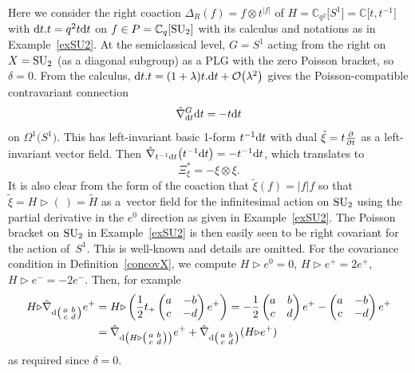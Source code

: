 \documentclass[10pt,a4paper]{amsart}
\numberwithin{equation}{section}
\newcommand{\C}{{\mathbb{C}}}
\newcommand{\<}{{\langle}}
\renewcommand{\>}{{\rangle}}
\newcommand{\tens}{\otimes}
\newcommand{\extd}{{\rm d}}
\newcommand{\del}{{\partial}}
\newcommand{\la}{{\triangleright}}
\begin{document}
\begin{Example}\label{exS2PB}
Here we consider the right coaction $\Delta_R(f)=f\tens t^{|f|}$ of $H=\C_{q^2}\big[S^1\big]=\C\big[t,t^{-1}\big]$ with $\extd t.t=q^2t\extd t$ on $f\in P=\C_q[{\rm SU}_2]$ with its calculus and notations as in Example~\ref{exSU2}. At the semiclassical level, $G=S^1$ acting from the right on $X={\rm SU}_2$ (as a diagonal subgroup) as a PLG with the zero Poisson bracket, so $\delta=0$. From the calculus, $\extd t.t=(1+{\lambda})t.\extd t+\mathcal{O}\big(\lambda^2\big)$ gives the Poisson-compatible contravariant connection
\begin{equation*}%
\hat\nabla^G_{\extd t}\extd t=-t\extd t\end{equation*}
on $\Omega^1\big(S^1\big)$. This has left-invariant basic 1-form $t^{-1}\extd t$ with dual $\tilde\xi=t{\del\over{\del t}}$ as a left-invariant vector field. Then $\hat\nabla_{t^{-1}\extd t}\big(t^{-1}\extd t\big)=-t^{-1}\extd t$, which translates to
\begin{equation}\label{conS2} \Xi_\xi^*=-\xi\tens\xi.\end{equation}
It is also clear from the form of the coaction that $\tilde{\xi}(f)=|f|f$ so that $\tilde\xi=H\la(\ )=\tilde H$ as a~vector field for the infinitesimal action on ${\rm SU}_2$ using the partial derivative in the $e^0$ direction as given in Example~\ref{exSU2}. The Poisson bracket on ${\rm SU}_2$ in Example~\ref{exSU2} is then easily seen to be right covariant for the action of~$S^1$. This is well-known and details are omitted.
For the covariance condition in Definition~\ref{concovX}, we compute $H\la e^0=0$, $H\la e^+=2e^+$, $H\la e^-=-2e^-$. Then, for example
\begin{align*}H\la\hat\nabla_{\extd\left(\begin{smallmatrix} a & b \\ c & d \end{smallmatrix}\right)}e^+&=H\la\left({1\over 2}t_+ \begin{pmatrix} a & -b \\ c & -d \end{pmatrix}e^+\right)=-{1\over 2} \begin{pmatrix} a & b \\ c & d \end{pmatrix}e^+- \begin{pmatrix} a & -b \\ c & -d \end{pmatrix}e^+\\
&=\hat\nabla_{\extd\left(H\la\left(\begin{smallmatrix} a & b \\ c & d \end{smallmatrix}\right)\right)}e^++\hat\nabla_{\extd\left(\begin{smallmatrix} a & b \\ c & d \end{smallmatrix}\right)}(H\la e^+)\end{align*}
as required since $\delta=0$. \end{Example}
\end{document}
